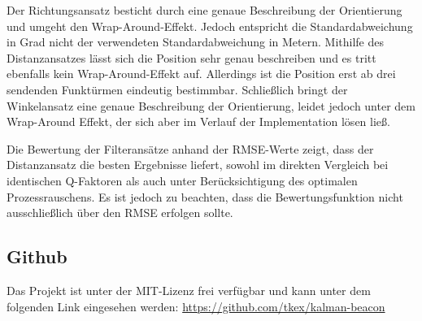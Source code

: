 \documentclass[conference]{IEEEtran}[10pt]
\begin{document}
Der Richtungsansatz besticht durch eine genaue Beschreibung der Orientierung und umgeht den Wrap-Around-Effekt. Jedoch entspricht die Standardabweichung in Grad nicht der verwendeten Standardabweichung in Metern. Mithilfe des Distanzansatzes lässt sich die Position sehr genau beschreiben und es tritt ebenfalls kein Wrap-Around-Effekt auf. Allerdings ist die Position erst ab drei sendenden Funktürmen eindeutig bestimmbar. Schließlich bringt der Winkelansatz eine genaue Beschreibung der Orientierung, leidet jedoch unter dem Wrap-Around Effekt, der sich aber im Verlauf der Implementation lösen ließ.

Die Bewertung der Filteransätze anhand der RMSE-Werte zeigt, dass der Distanzansatz die besten Ergebnisse liefert, sowohl im direkten Vergleich bei identischen Q-Faktoren als auch unter Berücksichtigung des optimalen Prozessrauschens. Es ist jedoch zu beachten, dass die Bewertungsfunktion nicht ausschließlich über den RMSE erfolgen sollte.




\subsection{Github}

Das Projekt ist unter der MIT-Lizenz frei verfügbar und kann unter dem folgenden Link eingesehen werden: \href{https://github.com/tkex/kalman-beacon}{https://github.com/tkex/kalman-beacon}




\end{document}
